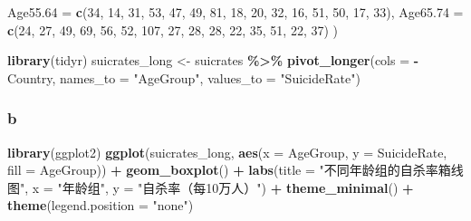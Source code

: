 \documentclass[
]{article}
\newenvironment{Shaded}{\begin{snugshade}}{\end{snugshade}}
\newcommand{\AttributeTok}[1]{\textcolor[rgb]{0.13,0.29,0.53}{#1}}
\newcommand{\DecValTok}[1]{\textcolor[rgb]{0.00,0.00,0.81}{#1}}
\newcommand{\FunctionTok}[1]{\textcolor[rgb]{0.13,0.29,0.53}{\textbf{#1}}}
\newcommand{\NormalTok}[1]{#1}
\newcommand{\OtherTok}[1]{\textcolor[rgb]{0.56,0.35,0.01}{#1}}
\newcommand{\SpecialCharTok}[1]{\textcolor[rgb]{0.81,0.36,0.00}{\textbf{#1}}}
\newcommand{\StringTok}[1]{\textcolor[rgb]{0.31,0.60,0.02}{#1}}
\begin{document}
\begin{Shaded}
\begin{Highlighting}[]
  \AttributeTok{Age55.64 =} \FunctionTok{c}\NormalTok{(}\DecValTok{34}\NormalTok{, }\DecValTok{14}\NormalTok{, }\DecValTok{31}\NormalTok{, }\DecValTok{53}\NormalTok{, }\DecValTok{47}\NormalTok{, }\DecValTok{49}\NormalTok{, }\DecValTok{81}\NormalTok{, }\DecValTok{18}\NormalTok{, }\DecValTok{20}\NormalTok{, }\DecValTok{32}\NormalTok{, }\DecValTok{16}\NormalTok{, }\DecValTok{51}\NormalTok{, }\DecValTok{50}\NormalTok{, }\DecValTok{17}\NormalTok{, }\DecValTok{33}\NormalTok{),}
  \AttributeTok{Age65.74 =} \FunctionTok{c}\NormalTok{(}\DecValTok{24}\NormalTok{, }\DecValTok{27}\NormalTok{, }\DecValTok{49}\NormalTok{, }\DecValTok{69}\NormalTok{, }\DecValTok{56}\NormalTok{, }\DecValTok{52}\NormalTok{, }\DecValTok{107}\NormalTok{, }\DecValTok{27}\NormalTok{, }\DecValTok{28}\NormalTok{, }\DecValTok{28}\NormalTok{, }\DecValTok{22}\NormalTok{, }\DecValTok{35}\NormalTok{, }\DecValTok{51}\NormalTok{, }\DecValTok{22}\NormalTok{, }\DecValTok{37}\NormalTok{)}
\NormalTok{)}


\FunctionTok{library}\NormalTok{(tidyr)}
\NormalTok{suicrates\_long }\OtherTok{\textless{}{-}}\NormalTok{ suicrates }\SpecialCharTok{\%\textgreater{}\%} 
  \FunctionTok{pivot\_longer}\NormalTok{(}\AttributeTok{cols =} \SpecialCharTok{{-}}\NormalTok{Country, }
               \AttributeTok{names\_to =} \StringTok{"AgeGroup"}\NormalTok{, }
               \AttributeTok{values\_to =} \StringTok{"SuicideRate"}\NormalTok{)}
\end{Highlighting}
\end{Shaded}

\subsubsection{b}\label{b-4}

\begin{Shaded}
\begin{Highlighting}[]
\FunctionTok{library}\NormalTok{(ggplot2)}
\FunctionTok{ggplot}\NormalTok{(suicrates\_long, }\FunctionTok{aes}\NormalTok{(}\AttributeTok{x =}\NormalTok{ AgeGroup, }\AttributeTok{y =}\NormalTok{ SuicideRate, }\AttributeTok{fill =}\NormalTok{ AgeGroup)) }\SpecialCharTok{+}
  \FunctionTok{geom\_boxplot}\NormalTok{() }\SpecialCharTok{+}
  \FunctionTok{labs}\NormalTok{(}\AttributeTok{title =} \StringTok{"不同年龄组的自杀率箱线图"}\NormalTok{,}
       \AttributeTok{x =} \StringTok{"年龄组"}\NormalTok{,}
       \AttributeTok{y =} \StringTok{"自杀率（每10万人）"}\NormalTok{) }\SpecialCharTok{+}
  \FunctionTok{theme\_minimal}\NormalTok{() }\SpecialCharTok{+}
  \FunctionTok{theme}\NormalTok{(}\AttributeTok{legend.position =} \StringTok{"none"}\NormalTok{)}
\end{Highlighting}
\end{Shaded}
\end{document}
